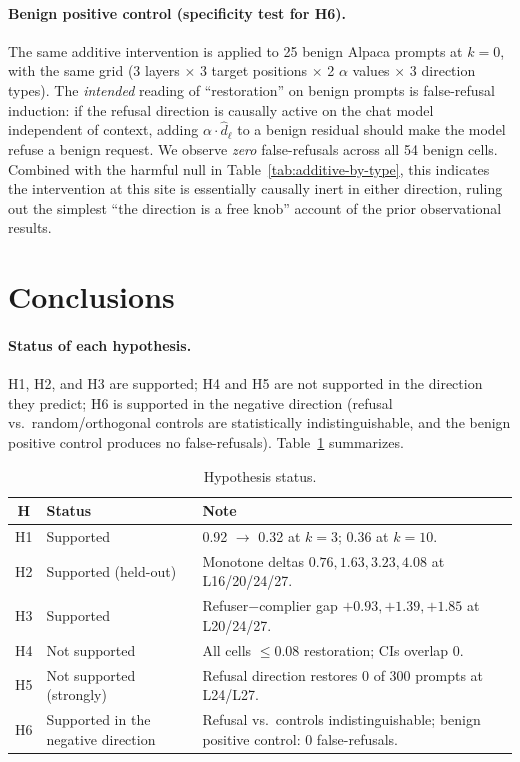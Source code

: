 \documentclass{article}
\begin{document}
\paragraph{Benign positive control (specificity test for H6).}
The same additive intervention is applied to 25 benign Alpaca prompts at
$k=0$, with the same grid (3 layers $\times$ 3 target positions $\times$
2 $\alpha$ values $\times$ 3 direction types). The \emph{intended}
reading of ``restoration'' on benign prompts is false-refusal induction:
if the refusal direction is causally active on the chat model
independent of context, adding $\alpha\cdot\hat{d}_\ell$ to a benign
residual should make the model refuse a benign request. We observe
\emph{zero} false-refusals across all 54 benign cells. Combined with the
harmful null in Table~\ref{tab:additive-by-type}, this indicates the
intervention at this site is essentially causally inert in either
direction, ruling out the simplest ``the direction is a free knob''
account of the prior observational results.

\FloatBarrier

\section{Conclusions}
\label{sec:conclusions}

\paragraph{Status of each hypothesis.}
H1, H2, and H3 are supported; H4 and H5 are not supported in the
direction they predict; H6 is supported in the negative direction
(refusal vs.\ random/orthogonal controls are statistically
indistinguishable, and the benign positive control produces no
false-refusals). Table~\ref{tab:hyp} summarizes.

\begin{table}[h]
\centering
\small
\caption{Hypothesis status.}
\label{tab:hyp}
\begin{tabular}{cll}
\toprule
H & Status & Note \\
\midrule
H1 & Supported & 0.92 $\rightarrow$ 0.32 at $k=3$; 0.36 at $k=10$. \\
H2 & Supported (held-out) & Monotone deltas $0.76, 1.63, 3.23, 4.08$ at L16/20/24/27. \\
H3 & Supported & Refuser$-$complier gap $+0.93, +1.39, +1.85$ at L20/24/27. \\
H4 & Not supported & All cells $\le 0.08$ restoration; CIs overlap 0. \\
H5 & Not supported (strongly) & Refusal direction restores 0 of 300 prompts at L24/L27. \\
H6 & Supported in the negative direction & Refusal vs.\ controls indistinguishable; benign positive control: 0 false-refusals. \\
\bottomrule
\end{tabular}
\end{table}
\end{document}

